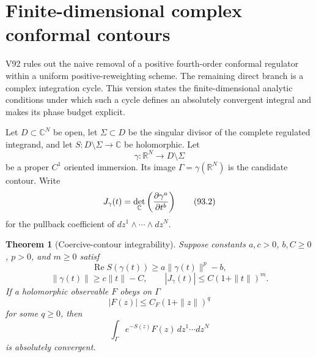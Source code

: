 \documentclass[11pt]{article}
\newtheorem{theorem}{Theorem}[section]
\begin{document}

\section{Finite-dimensional complex conformal contours}
\label{sec:v11v93}

V92 rules out the naive removal of a positive fourth-order conformal
regulator within a uniform positive-reweighting scheme.  The remaining
direct branch is a complex integration cycle.  This version states
the finite-dimensional analytic conditions under which such a cycle
defines an absolutely convergent integral and makes its phase budget
explicit.

Let \(D\subset\mathbb C^N\) be open, let
\(\Sigma\subset D\) be the singular divisor of the complete regulated
integrand, and let \(S:D\setminus\Sigma\to\mathbb C\) be holomorphic.
Let
\[
                       \gamma:\mathbb R^N\longrightarrow
                       D\setminus\Sigma                      \tag{93.1}
\]
be a proper \(C^1\) oriented immersion.  Its image
\(\Gamma=\gamma(\mathbb R^N)\) is the candidate contour.  Write
\[
 J_\gamma(t)=
 \det_{\mathbb C}\left({\partial\gamma^a\over\partial t^b}\right)
                                                                    \tag{93.2}
\]
for the pullback coefficient of
\(dz^1\wedge\cdots\wedge dz^N\).

\begin{theorem}[Coercive-contour integrability]
\label{thm:v11v93-integrability}
Suppose constants \(a,c>0\), \(b,C\ge0\), \(p>0\), and \(m\ge0\)
satisf
\[
 \operatorname{Re}S(\gamma(t))
                       \ge a\|\gamma(t)\|^p-b,               \tag{93.3}
\]
\[
 \|\gamma(t)\|\ge c\|t\|-C,\qquad
 |J_\gamma(t)|\le C(1+\|t\|)^m.                             \tag{93.4}
\]
If a holomorphic observable \(F\) obeys on \(\Gamma\)
\[
                         |F(z)|\le C_F(1+\|z\|)^q            \tag{93.5}
\]
for some \(q\ge0\), then
\[
                  \int_\Gamma e^{-S(z)}F(z)\,
                     dz^1\cdots dz^N                        \tag{93.6}
\]
is absolutely convergent.
\end{theorem}
\end{document}
